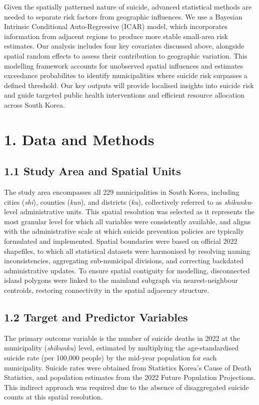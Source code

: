 \documentclass[11pt]{article}
\begin{document}
	Given the spatially patterned nature of suicide, advanced statistical methods are needed to separate risk factors from geographic influences. We use a Bayesian Intrinsic Conditional Auto-Regressive (ICAR) model, which incorporates information from adjacent regions to produce more stable small-area risk estimates. Our analysis includes four key covariates discussed above, alongside spatial random effects to assess their contribution to geographic variation. This modelling framework accounts for unobserved spatial influences and estimates exceedance probabilites to identify municipalities where suicide risk surpasses a defined threshold. Our key outputs will provide localised insights into suicide risk and guide targeted public health interventions and efficient resource allocation across South Korea.

	\section*{1. Data and Methods}
	
	\subsection*{1.1 Study Area and Spatial Units}
	
	The study area encompasses all 229 municipalities in South Korea, including cities (\textit{shi}), counties (\textit{kun}), and districts (\textit{ku}), collectively referred to as \textit{shikunku}-level administrative units. This spatial resolution was selected as it represents the most granular level for which all variables were consistently available, and aligns with the administrative scale at which suicide prevention policies are typically formulated and implemented. Spatial boundaries were based on official 2022 shapefiles, to which all statistical datasets were harmonised by resolving naming inconsistencies, aggregating sub-municipal divisions, and correcting backdated administrative updates. To ensure spatial contiguity for modelling, disconnected island polygons were linked to the mainland subgraph via nearest-neighbour centroids, restoring connectivity in the spatial adjacency structure.
	
	\subsection*{1.2 Target and Predictor Variables}
	
	The primary outcome variable is the number of suicide deaths in 2022 at the municipality (\textit{shikunku}) level, estimated by multiplying the age-standardised suicide rate (per 100,000 people) by the mid-year population for each municipality. Suicide rates were obtained from Statistics Korea's Cause of Death Statistics, and population estimates from the 2022 Future Population Projections. This indirect approach was required due to the absence of disaggregated suicide counts at this spatial resolution.
	
\end{document}
